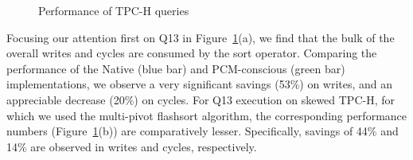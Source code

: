 \begin{figure}[htpb]

\centering

%  
\hspace{0mm}
\hspace{0mm}
\caption{Performance of TPC-H queries}
\label{fig:overall_results}
\end{figure}


Focusing our attention first on Q13 in
Figure~\ref{fig:overall_results}(a), we find that the bulk of the
overall writes and cycles are consumed by the sort operator. Comparing
the performance of the Native (blue bar) and PCM-conscious (green bar)
implementations, we observe a very significant savings (53\%) on writes,
and an appreciable decrease (20\%) on cycles. For Q13 execution on skewed 
TPC-H, for which we used the multi-pivot flashsort algorithm, 
the corresponding performance numbers (Figure~\ref{fig:overall_results}(b)) are
comparatively lesser. Specifically, savings of 
44\% and 14\%  are observed in writes and cycles, respectively.


